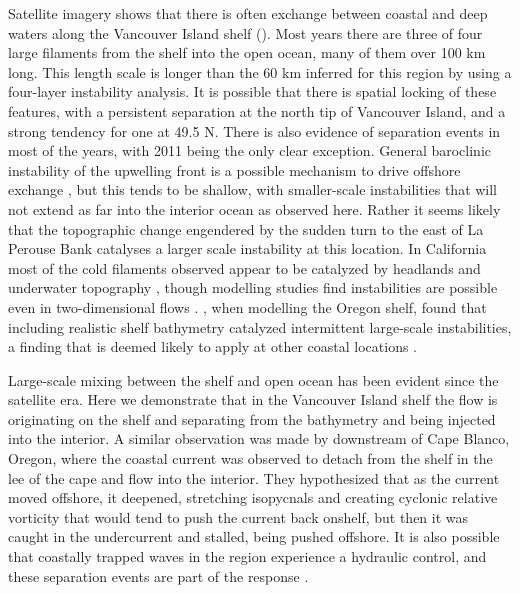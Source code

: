 \documentclass[draft]{agujournal2019}
\begin{document}
Satellite imagery shows that there is often exchange between coastal and deep waters along the Vancouver Island shelf ().  Most years there are three of four large filaments from the shelf into the open ocean, many of them over 100 km long.  This length scale is longer than the 60 km inferred for this region by  using a four-layer instability analysis.  It is possible that there is spatial locking of these features, with a persistent separation at the north tip of Vancouver Island, and a strong tendency for one at 49.5 N. There is also evidence of separation events in most of the years, with 2011 being the only clear exception. General baroclinic instability of the upwelling front is a possible mechanism to drive offshore exchange \cite{ikedaetal84,durskiallen05}, but this tends to be shallow, with smaller-scale instabilities that will not extend as far into the interior ocean as observed here.  Rather it seems likely that the topographic change engendered by the sudden turn to the east of La Perouse Bank catalyses a larger scale instability at this location.  In California most of the cold filaments observed appear to be catalyzed by headlands and underwater topography \cite{strubetal91}, though modelling studies find instabilities are possible even in two-dimensional flows \cite{pierceetal91}.  , when modelling the Oregon shelf, found that including realistic shelf bathymetry catalyzed intermittent large-scale instabilities, a finding that is deemed likely to apply at other coastal locations \cite{batteen97}.

Large-scale mixing between the shelf and open ocean has been evident since the satellite era.  Here we demonstrate that in the Vancouver Island shelf the flow is originating on the shelf and separating from the bathymetry and being injected into the interior.  A  similar observation was made by  downstream of Cape Blanco, Oregon, where the coastal current was observed to detach from the shelf in the lee of the cape and flow into the interior.  They hypothesized that as the current moved offshore, it deepened, stretching isopycnals and creating cyclonic relative vorticity that would tend to push the current back onshelf, but then it was caught in the undercurrent and stalled, being pushed offshore. It is also possible that coastally trapped waves in the region experience a hydraulic control, and these separation events are part of the response \cite{dalebarth01}.
\end{document}
